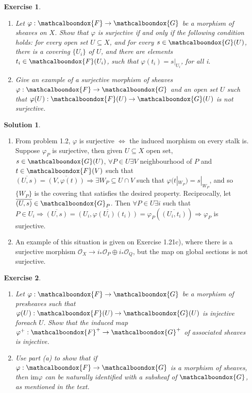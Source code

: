 \documentclass[12pt]{article}
\newcommand{\imp}{\ensuremath{\Rightarrow}}
\newcommand{\ima}{\ensuremath{\mathrm{im}}}
\newcommand{\locO}{\ensuremath{\mathcal{O}}}
\newtheorem{ex}{Exercise}[section]
\theoremstyle{definition}
\newtheorem*{sol}{Solution}
\newcommand{\sF}{\ensuremath{\mathcalboondox{F}}}
\newcommand{\sG}{\ensuremath{\mathcalboondox{G}}}
\begin{document}
\begin{ex}
	\begin{enumerate}[label=\alph*)]
		\item Let $\varphi: \sF \to \sG$ be a morphism of sheaves on $X$. Show that $\varphi$ is surjective if and only if the following condition holds: for every open set $U \subseteq X$, and for every $s \in \sG(U)$, there is a covering $\{U_i\}$ of $U$, and there are elements $t_i \in \sF(U_i)$, such that $\varphi(t_i) = s|_{U_i}$, for all i.

		\item Give an example of a surjective morphism of sheaves $\varphi: \sF \to \sG$ and an open set $U$ such that $\varphi(U): \sF(U) \to \sG(U)$ is not surjective.
	\end{enumerate}
\end{ex}

\begin{sol}
	\begin{enumerate}[label=\alph*)]
		\item From problem 1.2, $\varphi$ is surjective $\iff$ the induced morphism on every stalk is. Suppose $\varphi_P$ is surjective, then given $U \subseteq X$ open set, $s \in \sG(U)$, $\forall P \in U \exists V$ neighbourhood of $P$ and $t \in \sF(V)$ such that $\overline{(U,s)} = \overline{(V,\varphi(t))} \imp \exists W_P \subseteq U \cap V$ such that $\varphi(t|_{W_P}) = s|_{W_P}$, and so $\{W_P\}$ is the covering that satisfies the desired property. Reciprocally, let $\overline{(U,s)} \in \sG_P$. Then $\forall P \in U \exists i$ such that $P \in U_i \imp \overline{(U,s)} = \overline{(U_i, \varphi(U_i)(t_i))} = \varphi_P(\overline{(U_i, t_i)}) \imp \varphi_P$ is surjective.

		\item An example of this situation is given on Exercise 1.21c), where there is a surjective morphism $\locO_X \to i_*\locO_P \oplus i_* \locO_Q$, but the map on global sections is not surjective.
	\end{enumerate}
\end{sol}

\begin{ex}
	\begin{enumerate}[label=\alph*)]
		\item Let $\varphi: \sF \to \sG$ be a morphism of presheaves such that $\varphi(U): \sF(U) \to \sG(U)$ is injective foreach $U$. Show that the induced map $\varphi^{+}: \sF^{+} \to \sG^{+}$ of associated sheaves is injective.

		\item Use part (a) to show that if $\varphi: \sF \to \sG$ is a morphism of sheaves, then $\ima \varphi$ can be naturally identified with a subsheaf of $\sG$, as mentioned in the text.
	\end{enumerate}
\end{ex}
\end{document}
